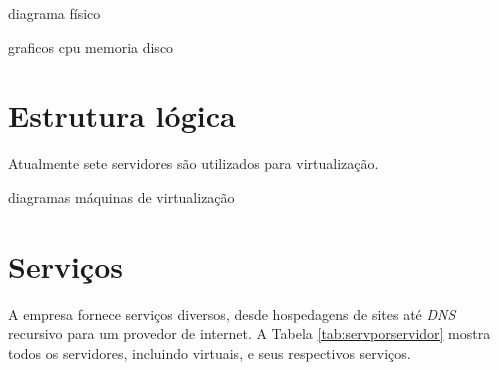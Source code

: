 diagrama físico

graficos cpu memoria disco

\section{Estrutura lógica}
\label{section:estlog}

Atualmente sete servidores são utilizados para virtualização.

diagramas máquinas de virtualização

\section{Serviços}
\label{section:serv}

A empresa fornece serviços diversos, desde hospedagens de sites até \textit{DNS} recursivo para um provedor de internet.
A Tabela \ref{tab:servporservidor} mostra todos os servidores, incluindo virtuais, e seus respectivos serviços.

